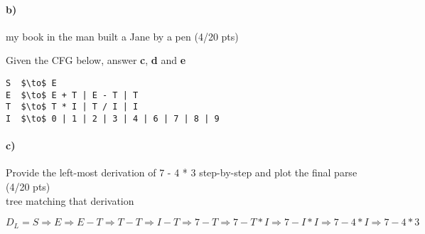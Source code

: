 \documentclass[a4paper,12pt]{article}
\begin{document}
\paragraph{b)} my book in the man built a Jane by a pen \hfill \small{(4/20 pts)} \\

\begin{tcolorbox}
\end{tcolorbox}

\newpage

Given the CFG below, answer \textbf{c}, \textbf{d} and \textbf{e} \\

\begin{lstlisting}[style=output,mathescape=true]
S  $\to$ E
E  $\to$ E + T | E - T | T
T  $\to$ T * I | T / I | I
I  $\to$ 0 | 1 | 2 | 3 | 4 | 6 | 7 | 8 | 9
\end{lstlisting}

\paragraph{c)} Provide the left-most derivation of 7 - 4 * 3 step-by-step and plot the final parse \hfill \small{(4/20 pts)} \\
tree matching that derivation \\

\begin{tcolorbox}
$
D_L = 
S \Rightarrow
E \Rightarrow
E - T \Rightarrow
T - T \Rightarrow
I - T \Rightarrow
7 - T \Rightarrow
7 - T * I \Rightarrow
7 - I * I \Rightarrow
7 - 4 * I \Rightarrow
7 - 4 * 3
$
\begin{center}
\end{center}
\end{tcolorbox}
\end{document}
